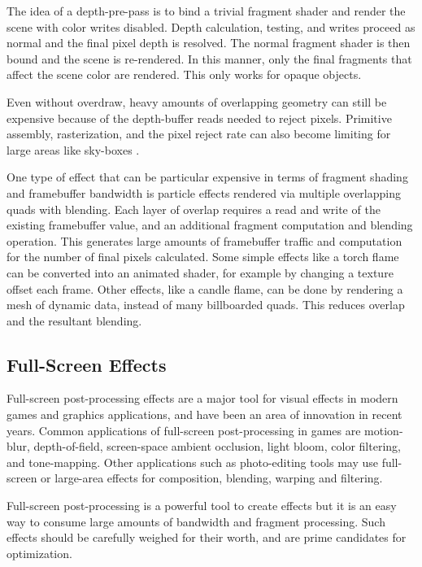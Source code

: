 The idea of a depth-pre-pass is to bind a trivial fragment shader and render
the scene with color writes disabled.  Depth calculation, testing, and writes
proceed as normal and the final pixel depth is resolved.  The normal
fragment shader is then bound and the scene is re-rendered.  In this manner,
only the final fragments that affect the scene color are rendered.  This only
works for opaque objects.

Even without overdraw, heavy amounts of overlapping geometry can still be
expensive because of the depth-buffer reads needed to reject pixels.  Primitive
assembly, rasterization, and the pixel reject rate can also become limiting for
large areas like sky-boxes \cite{Pranckevicius11a}.

One type of effect that can be particular expensive in terms of fragment
shading and framebuffer bandwidth is particle effects rendered via multiple
overlapping quads with blending.  Each layer of overlap requires a read and
write of the existing framebuffer value, and an additional fragment computation
and blending operation.  This generates large amounts of framebuffer traffic
and computation for the number of final pixels calculated.  Some simple effects
like a torch flame can be converted into an animated shader, for example by
changing a texture offset each frame.  Other effects, like a candle flame, can
be done by rendering a mesh of dynamic data, instead of many billboarded quads.  This
reduces overlap and the resultant blending.

\subsection {Full-Screen Effects}\label{Jon-McCaffrey-Full-Screen-Effects}
Full-screen post-processing effects are a major tool for visual effects in
modern games and graphics applications, and have been an area of innovation in
recent years.   Common applications of full-screen post-processing in games are
motion-blur, depth-of-field, screen-space ambient occlusion, light bloom, color
filtering, and tone-mapping.  Other applications such as photo-editing tools
may use full-screen or large-area effects for composition, blending, warping
and filtering.

Full-screen post-processing is a powerful tool to create effects but it is an
easy way to consume large amounts of bandwidth and fragment processing.  Such
effects should be carefully weighed for their worth, and are prime candidates
for optimization.  

